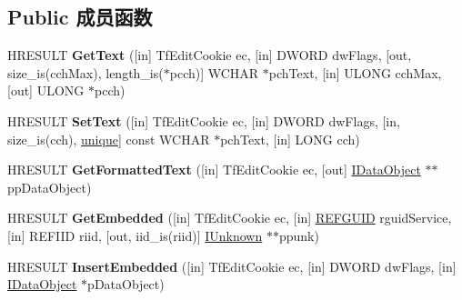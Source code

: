 \subsection*{Public 成员函数}
\begin{DoxyCompactItemize}
\item 
\mbox{\label{interface_i_tf_range_a1c023454d043f720e42ed87985d2b8b1}} 
H\+R\+E\+S\+U\+LT {\bfseries Get\+Text} (\mbox{[}in\mbox{]} Tf\+Edit\+Cookie ec, \mbox{[}in\mbox{]} D\+W\+O\+RD dw\+Flags, \mbox{[}out, size\+\_\+is(cch\+Max), length\+\_\+is($\ast$pcch)\mbox{]} W\+C\+H\+AR $\ast$pch\+Text, \mbox{[}in\mbox{]} U\+L\+O\+NG cch\+Max, \mbox{[}out\mbox{]} U\+L\+O\+NG $\ast$pcch)
\item 
\mbox{\label{interface_i_tf_range_a6530bb5682de398d3a842883316c5783}} 
H\+R\+E\+S\+U\+LT {\bfseries Set\+Text} (\mbox{[}in\mbox{]} Tf\+Edit\+Cookie ec, \mbox{[}in\mbox{]} D\+W\+O\+RD dw\+Flags, \mbox{[}in, size\+\_\+is(cch), \hyperlink{interfaceunique}{unique}\mbox{]} const W\+C\+H\+AR $\ast$pch\+Text, \mbox{[}in\mbox{]} L\+O\+NG cch)
\item 
\mbox{\label{interface_i_tf_range_a27d4c11a180d9506059b5c4d56ab60ab}} 
H\+R\+E\+S\+U\+LT {\bfseries Get\+Formatted\+Text} (\mbox{[}in\mbox{]} Tf\+Edit\+Cookie ec, \mbox{[}out\mbox{]} \hyperlink{interface_i_data_object}{I\+Data\+Object} $\ast$$\ast$pp\+Data\+Object)
\item 
\mbox{\label{interface_i_tf_range_abf295a9fb8ceb61c5ea270ff519f53e5}} 
H\+R\+E\+S\+U\+LT {\bfseries Get\+Embedded} (\mbox{[}in\mbox{]} Tf\+Edit\+Cookie ec, \mbox{[}in\mbox{]} \hyperlink{struct___g_u_i_d}{R\+E\+F\+G\+U\+ID} rguid\+Service, \mbox{[}in\mbox{]} R\+E\+F\+I\+ID riid, \mbox{[}out, iid\+\_\+is(riid)\mbox{]} \hyperlink{interface_i_unknown}{I\+Unknown} $\ast$$\ast$ppunk)
\item 
\mbox{\label{interface_i_tf_range_ab8f46de4be4ac386a77bedf15c9c1a1a}} 
H\+R\+E\+S\+U\+LT {\bfseries Insert\+Embedded} (\mbox{[}in\mbox{]} Tf\+Edit\+Cookie ec, \mbox{[}in\mbox{]} D\+W\+O\+RD dw\+Flags, \mbox{[}in\mbox{]} \hyperlink{interface_i_data_object}{I\+Data\+Object} $\ast$p\+Data\+Object)
\item 
\mbox{\label{interface_i_tf_range_a390db16a9de79456cd99070ad260cbfb}} 

\end{DoxyCompactItemize}
